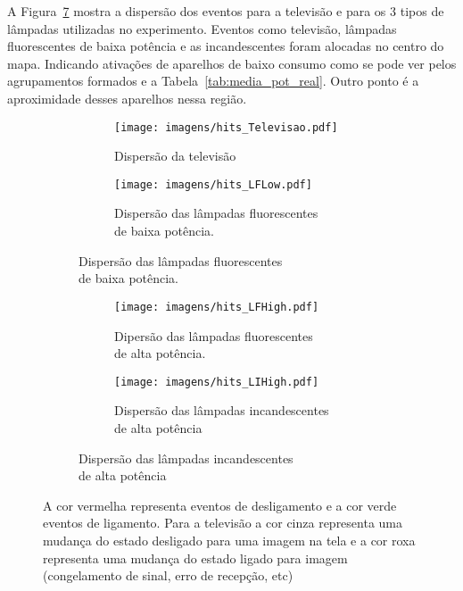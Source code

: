 A Figura~\ref{fig:eletronicos} mostra a dispersão dos eventos para a
televisão e para os 3 tipos de lâmpadas utilizadas no experimento.
Eventos como televisão, lâmpadas fluorescentes de baixa potência e as
incandescentes foram alocadas no centro do mapa. Indicando ativações
de aparelhos de baixo consumo como se pode ver pelos agrupamentos
formados e a Tabela~\ref{tab:media_pot_real}. Outro ponto é a
aproximidade desses aparelhos nessa região. 

\begin{figure}[h!t]
  \begin{center}
    \begin{subfigure}[c]{\textwidth}
      \begin{subfigure}[c]{8cm}
        \texttt{[image: imagens/hits\_Televisao.pdf]}
        \caption{Dispersão da televisão}
        \label{fig:hits_televisao}
      \end{subfigure}
      \begin{subfigure}[c]{8cm}
        \texttt{[image: imagens/hits\_LFLow.pdf]}
        \caption{Dispersão das lâmpadas fluorescentes\\ de baixa
  potência.}
        \label{fig:hits_lf_ap}
      \end{subfigure}
    \end{subfigure}

    \begin{subfigure}[c]{\textwidth}
      \begin{subfigure}[c]{8cm}
        \texttt{[image: imagens/hits\_LFHigh.pdf]}
        \caption{Dipersão das lâmpadas fluorescentes\\ de alta potência.}
        \label{fig:hits_lw_bp}
      \end{subfigure}
      \begin{subfigure}[c]{8cm}
        \texttt{[image: imagens/hits\_LIHigh.pdf]}
        \caption{Dispersão das lâmpadas incandescentes\\ de alta potência}
        \label{fig:hits_li_ap}
      \end{subfigure}
    \end{subfigure}
  \end{center}
\caption{A cor vermelha representa eventos de desligamento e a cor
verde eventos de ligamento. Para a televisão a cor cinza representa
uma mudança do estado desligado para uma imagem na tela e a cor roxa
representa uma mudança do estado ligado para imagem (congelamento de
sinal, erro de recepção, etc)}
\label{fig:eletronicos}
\end{figure}

